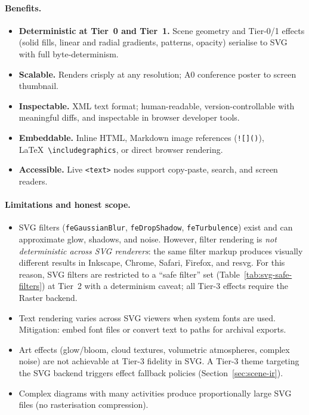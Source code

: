 \paragraph{Benefits.}
\begin{itemize}
  \item \textbf{Deterministic at Tier~0 and Tier~1.} Scene geometry and Tier-0/1 effects
        (solid fills, linear and radial gradients, patterns, opacity) serialise to SVG
        with full byte-determinism.
  \item \textbf{Scalable.} Renders crisply at any resolution; A0 conference poster to
        screen thumbnail.
  \item \textbf{Inspectable.} XML text format; human-readable, version-controllable with
        meaningful diffs, and inspectable in browser developer tools.
  \item \textbf{Embeddable.} Inline HTML, Markdown image references (\texttt{![]()}),
        \LaTeX\ \texttt{\textbackslash{}includegraphics}, or direct browser rendering.
  \item \textbf{Accessible.} Live \texttt{<text>} nodes support copy-paste, search, and
        screen readers.
\end{itemize}

\paragraph{Limitations and honest scope.}
\begin{itemize}
  \item SVG filters (\texttt{feGaussianBlur}, \texttt{feDropShadow},
        \texttt{feTurbulence}) exist and can approximate glow, shadows, and noise.
        However, filter rendering is \emph{not deterministic across SVG renderers}: the
        same filter markup produces visually different results in Inkscape, Chrome, Safari,
        Firefox, and resvg. For this reason, SVG filters are restricted to a ``safe
        filter'' set (Table~\ref{tab:svg-safe-filters}) at Tier~2 with a determinism
        caveat; all Tier-3 effects require the Raster backend.
  \item Text rendering varies across SVG viewers when system fonts are used. Mitigation:
        embed font files or convert text to paths for archival exports.
  \item Art effects (glow/bloom, cloud textures, volumetric atmospheres, complex noise)
        are not achievable at Tier-3 fidelity in SVG. A Tier-3 theme targeting the SVG
        backend triggers effect fallback policies
        (Section~\ref{sec:scene-ir}).
  \item Complex diagrams with many activities produce proportionally large SVG files
        (no rasterisation compression).
\end{itemize}

